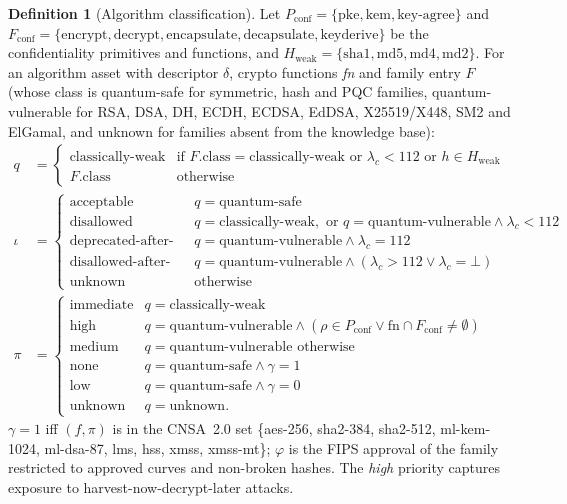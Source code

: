 \documentclass[11pt,a4paper]{article}
\theoremstyle{definition}
\newtheorem{definition}{Definition}[section]
\theoremstyle{plain}
\begin{document}
\begin{definition}[Algorithm classification]\label{def:classify}
Let $P_{\mathrm{conf}} = \{\text{pke}, \text{kem}, \text{key-agree}\}$ and
$F_{\mathrm{conf}} = \{\text{encrypt}, \text{decrypt}, \text{encapsulate}, \text{decapsulate}, \text{keyderive}\}$
be the confidentiality primitives and functions, and $H_{\mathrm{weak}} = \{\text{sha1}, \text{md5},
\text{md4}, \text{md2}\}$. For an algorithm asset with descriptor $\delta$, crypto functions
\emph{fn} and family entry $F$ (whose class is quantum-safe for symmetric, hash and PQC
families, quantum-vulnerable for RSA, DSA, DH, ECDH, ECDSA, EdDSA, X25519/X448, SM2 and
ElGamal, and unknown for families absent from the knowledge base):
\begin{align*}
q &= \begin{cases}
  \text{classically-weak} & \text{if } F.\text{class} = \text{classically-weak} \text{ or } \lambda_c < 112 \text{ or } h \in H_{\mathrm{weak}}\\
  F.\text{class} & \text{otherwise}
\end{cases}\\
\iota &= \begin{cases}
  \text{acceptable} & q = \text{quantum-safe}\\
  \text{disallowed} & q = \text{classically-weak}, \text{ or } q = \text{quantum-vulnerable} \wedge \lambda_c < 112\\
  \text{deprecated-after-2030} & q = \text{quantum-vulnerable} \wedge \lambda_c = 112\\
  \text{disallowed-after-2035} & q = \text{quantum-vulnerable} \wedge (\lambda_c > 112 \vee \lambda_c = \bot)\\
  \text{unknown} & \text{otherwise}
\end{cases}\\
\pi &= \begin{cases}
  \text{immediate} & q = \text{classically-weak}\\
  \text{high} & q = \text{quantum-vulnerable} \wedge (\rho \in P_{\mathrm{conf}} \vee \text{fn} \cap F_{\mathrm{conf}} \ne \emptyset)\\
  \text{medium} & q = \text{quantum-vulnerable} \text{ otherwise}\\
  \text{none} & q = \text{quantum-safe} \wedge \gamma = 1\\
  \text{low} & q = \text{quantum-safe} \wedge \gamma = 0\\
  \text{unknown} & q = \text{unknown}.
\end{cases}
\end{align*}
$\gamma = 1$ iff $(f,\pi)$ is in the CNSA~2.0 set \{aes-256, sha2-384, sha2-512, ml-kem-1024,
ml-dsa-87, lms, hss, xmss, xmss-mt\}; $\varphi$ is the FIPS approval of the family restricted to
approved curves and non-broken hashes. The \emph{high} priority captures exposure to
harvest-now-decrypt-later attacks.
\end{definition}
\end{document}
